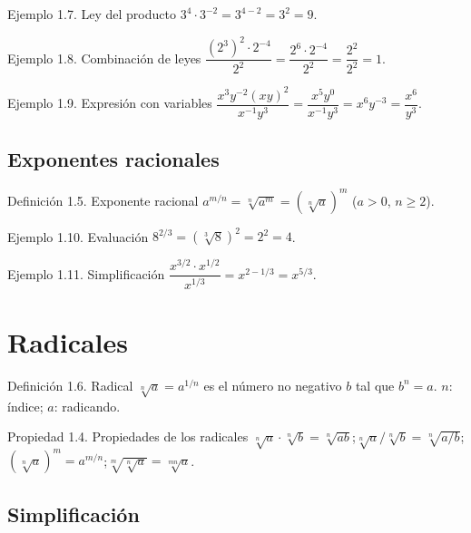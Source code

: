 \documentclass[12pt,letterpaper]{book}
\begin{document}
\begin{ejbox}{Ejemplo 1.7. Ley del producto}
$3^4\cdot3^{-2}=3^{4-2}=3^2=9$.
\end{ejbox}

\begin{ejbox}{Ejemplo 1.8. Combinación de leyes}
$\dfrac{(2^3)^2\cdot2^{-4}}{2^2}=\dfrac{2^6\cdot2^{-4}}{2^2}=\dfrac{2^2}{2^2}=1$.
\end{ejbox}

\begin{ejbox}{Ejemplo 1.9. Expresión con variables}
$\dfrac{x^3y^{-2}(xy)^2}{x^{-1}y^3}=\dfrac{x^5y^0}{x^{-1}y^3}=x^6y^{-3}=\dfrac{x^6}{y^3}$.
\end{ejbox}

\subsection{Exponentes racionales}

\begin{defbox}{Definición 1.5. Exponente racional}
$a^{m/n}=\sqrt[n]{a^m}=(\sqrt[n]{a})^m$ ($a>0$, $n\geq2$).
\end{defbox}

\begin{ejbox}{Ejemplo 1.10. Evaluación}
$8^{2/3}=(\sqrt[3]{8})^2=2^2=4$.
\end{ejbox}

\begin{ejbox}{Ejemplo 1.11. Simplificación}
$\dfrac{x^{3/2}\cdot x^{1/2}}{x^{1/3}}=x^{2-1/3}=x^{5/3}$.
\end{ejbox}

\section{Radicales}

\begin{defbox}{Definición 1.6. Radical}
$\sqrt[n]{a}=a^{1/n}$ es el número no negativo $b$ tal que $b^n=a$. $n$: índice; $a$: radicando.
\end{defbox}

\begin{propbox}{Propiedad 1.4. Propiedades de los radicales}
$\sqrt[n]{a}\cdot\sqrt[n]{b}=\sqrt[n]{ab}$;\quad $\sqrt[n]{a}/\sqrt[n]{b}=\sqrt[n]{a/b}$;\quad $(\sqrt[n]{a})^m=a^{m/n}$;\quad $\sqrt[m]{\sqrt[n]{a}}=\sqrt[mn]{a}$.
\end{propbox}

\subsection{Simplificación}
\end{document}
